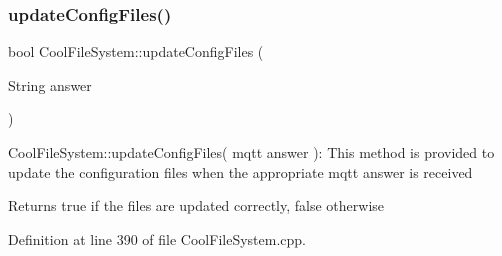 \subsubsection{\texorpdfstring{update\+Config\+Files()}{updateConfigFiles()}}
{\footnotesize\ttfamily bool Cool\+File\+System\+::update\+Config\+Files (\begin{DoxyParamCaption}\item[{String}]{answer }\end{DoxyParamCaption})}

Cool\+File\+System\+::update\+Config\+Files( mqtt answer )\+: This method is provided to update the configuration files when the appropriate mqtt answer is received

\begin{DoxyReturn}{Returns}
true if the files are updated correctly, false otherwise 
\end{DoxyReturn}


Definition at line 390 of file Cool\+File\+System.\+cpp.


